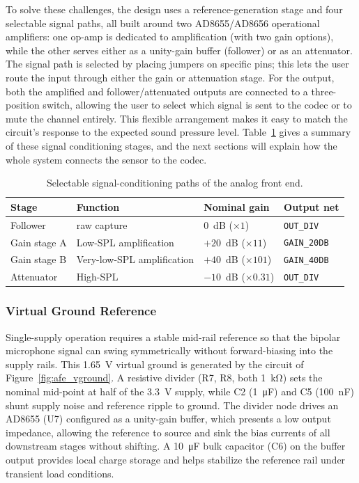 To solve these challenges, the design uses a reference-generation stage and four selectable signal paths, all built around two AD8655/AD8656 operational amplifiers: one op-amp is dedicated to amplification (with two gain options), while the other serves either as a unity-gain buffer (follower) or as an attenuator. The signal path is selected by placing jumpers on specific pins; this lets the user route the input through either the gain or attenuation stage. For the output, both the amplified and follower/attenuated outputs are connected to a three-position switch, allowing the user to select which signal is sent to the codec or to mute the channel entirely. This flexible arrangement makes it easy to match the circuit’s response to the expected sound pressure level. Table~\ref{tab:afe_paths} gives a summary of these signal conditioning stages, and the next sections will explain how the whole system connects the sensor to the codec.

\begin{table}[h!]
\centering
\begin{tabular}{|l|l|l|l|}
\hline
\textbf{Stage} & \textbf{Function} & \textbf{Nominal gain} & \textbf{Output net} \\ \hline
Follower & raw capture & $0$~dB ($\times 1$) & \texttt{OUT\_DIV}\\\hline
Gain stage A & Low-SPL amplification & $+20$~dB ($\times 11$) & \texttt{GAIN\_20DB} \\ \hline
Gain stage B & Very-low-SPL amplification & $+40$~dB ($\times 101$) & \texttt{GAIN\_40DB} \\\hline
Attenuator & High-SPL  & $-10$~dB ($\times 0.31$) & \texttt{OUT\_DIV} \\
\hline
\end{tabular}
\caption{Selectable signal-conditioning paths of the analog front end.}
\label{tab:afe_paths}
\end{table}

\subsubsection{Virtual Ground Reference}

Single-supply operation requires a stable mid-rail reference so that the bipolar microphone signal can swing symmetrically without forward-biasing into the supply rails. This \SI{1.65}{\volt} virtual ground is generated by the circuit of Figure~\ref{fig:afe_vground}. A resistive divider (R7, R8, both \SI{1}{\kilo\ohm}) sets the nominal mid-point at half of the \SI{3.3}{\volt} supply, while C2 (\SI{1}{\micro\farad}) and C5 (\SI{100}{\nano\farad}) shunt supply noise and reference ripple to ground. The divider node drives an AD8655 (U7) configured as a unity-gain buffer, which presents a low output impedance, allowing the reference to source and sink the bias currents of all downstream stages without shifting. A \SI{10}{\micro\farad} bulk capacitor (C6) on the buffer output provides local charge storage and helps stabilize the reference rail under transient load conditions.

